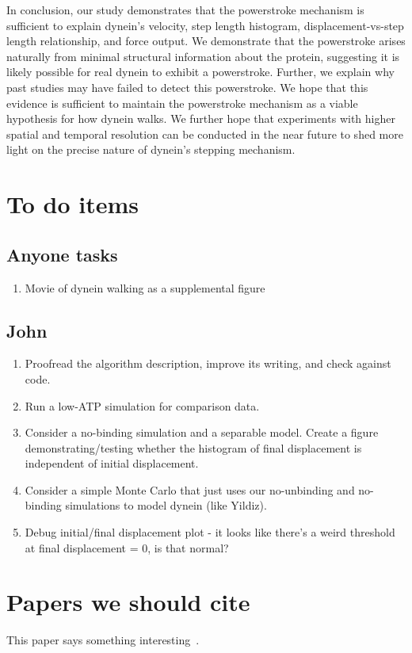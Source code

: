\documentclass[9pt,twocolumn,twoside]{article}
\begin{document}
In conclusion, our study demonstrates that the powerstroke mechanism is sufficient to explain dynein's velocity, step length histogram, displacement-vs-step length relationship, and force output. We demonstrate that the powerstroke arises naturally from minimal structural information about the protein, suggesting it is likely possible for real dynein to exhibit a powerstroke. Further, we explain why past studies may have failed to detect this powerstroke. We hope that this evidence is sufficient to maintain the powerstroke mechanism as a viable hypothesis for how dynein walks. We further hope that experiments with higher spatial and temporal resolution can be conducted in the near future to shed more light on the precise nature of dynein's stepping mechanism.


\section{To do items}

\subsection{Anyone tasks}
\begin{enumerate}
\item Movie of dynein walking as a supplemental figure
\end{enumerate}

\subsection{John}
\begin{enumerate}
\item Proofread the algorithm description, improve its writing, and
  check against code.
\item Run a low-ATP simulation for comparison data.
\item Consider a no-binding simulation and a separable model.  Create
  a figure demonstrating/testing whether the histogram of final
  displacement is independent of initial displacement.
\item Consider a simple Monte Carlo that just uses our no-unbinding
  and no-binding simulations to model dynein (like Yildiz).
\item Debug initial/final displacement plot - it looks like there's a weird
  threshold at final displacement = 0, is that normal?
\end{enumerate}

\section{Papers we should cite}
This paper says something interesting~\cite{leschziner}.



\end{document}
